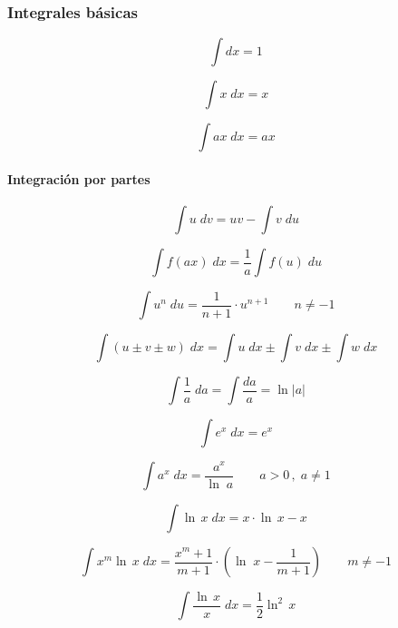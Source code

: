 \documentclass[11pt, twocolumn, landscape, a4paper]{article}
\begin{document}
\subsubsection*{Integrales básicas}
\[ \int dx = 1 \]

$$
\int x\;dx = x
$$

$$
\int ax\;dx = ax
$$

\paragraph*{Integración por partes}
$$
\int u\;dv = uv - \int v\;du
$$

$$
\int f(ax)\;dx = \dfrac1{a} \int f(u)\;du
$$

$$
\int u^{n}\;du = \dfrac1{n + 1} \cdot u^{n + 1}\qquad n \neq -1
$$

$$
\int (u \pm v \pm w)\;dx = \int u\;dx \pm \int v\;dx \pm \int w\;dx
$$

$$
\int \dfrac1{a}\;da = \int \dfrac{da}{a} = \ln |a|
$$

$$
\int e^{x}\;dx = e^{x}
$$

$$
\int a^{x}\;dx = \dfrac{a^{x}}{\ln\;a}\qquad a > 0\,,\;a \neq 1
$$

$$
\int \ln\,x\;dx = x \cdot \ln\,x - x
$$

$$
\int x^{m}\ln\,x\;dx = \dfrac{x^{m} + 1}{m + 1} \cdot (\ln\;x - \dfrac1{m + 1})\qquad m \neq -1
$$

$$
\int \dfrac{\ln\,x}{x}\;dx = \dfrac1{2}\ln^{2}\,x
$$
\end{document}
